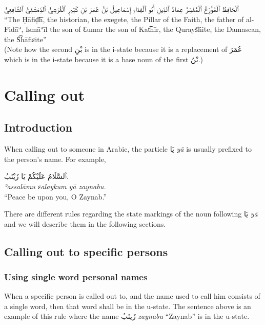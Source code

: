 \documentclass[
  10pt,
]{book}
\begin{document}
\foreignlanguage{arabic}{ٱلْحَافِظُ ٱلْمُؤَرِّخُ ٱلْمُفَسِّرُ عِمَادُ ٱلدِّينِ أَبُو ٱلْفِدَاءِ إِسْمَاعِيلُ بْنُ عُمَرَ بْنِ کَثِيرٍ ٱلْقُرَشِيُّ ٱلدِّمَشْقِيُّ ٱلشَّافِعِيُّ}\\
\enquote{The Ḥāfiḍ͡h, the historian, the exegete, the Pillar of the Faith, the father of al-Fidāʾ, Ismāʾīl the son of Ɛumar the son of Kat͡hīr, the Qurays͡hite, the Damascan, the S͡hāfiɛite}\\
(Note how the second \foreignlanguage{arabic}{بْنِ} is in the i-state because it is a replacement of \foreignlanguage{arabic}{عُمَرَ} which is in the i-state because it is a base noun of the first \foreignlanguage{arabic}{بْنُ}.)

\chapter{Calling out}\label{calling-out}

\section{Introduction}\label{introduction-13}

When calling out to someone in Arabic, the particle \foreignlanguage{arabic}{يَا} \emph{yā} is usually prefixed to the person's name. For example,

\foreignlanguage{arabic}{ٱَلسَّلَامُ عَلَيْکُمْ يَا زَيْنَبُ.}\\
\emph{ʾassalāmu ɛalaykum yā zaynabu.}\\
\enquote{Peace be upon you, O Zaynab.}

There are different rules regarding the state markings of the noun following \foreignlanguage{arabic}{يَا} \emph{yā} and we will describe them in the following sections.

\section{Calling out to specific persons}\label{calling-out-to-specific-persons}

\subsection{Using single word personal names}\label{using-single-word-personal-names}

When a specific person is called out to, and the name used to call him consists of a single word, then that word shall be in the u-state. The sentence above is an example of this rule where the name \foreignlanguage{arabic}{زَينَبُ} \emph{zaynabu} \enquote{Zaynab} is in the u-state.
\end{document}
